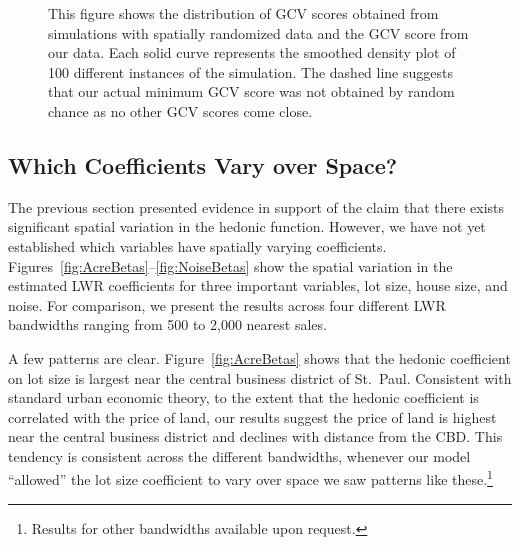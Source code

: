 \documentclass{article}\usepackage[]{graphicx}\usepackage[]{color}
\begin{document}
\begin{figure}
 \caption{This figure shows the distribution of GCV scores obtained from simulations with spatially randomized data and the GCV score from our data. Each solid curve represents the smoothed density plot of 100 different instances of the simulation. The dashed line suggests that our actual minimum GCV score was not obtained by random chance as no other GCV scores come close.}
 \label{fig:GCVSIM}
\end{figure}

\subsection*{Which Coefficients Vary over Space?}

The previous section presented evidence in support of the claim that there exists significant spatial variation in the hedonic function. However, we have not yet established which variables have spatially varying coefficients. Figures~\ref{fig:AcreBetas}--\ref{fig:NoiseBetas} show the spatial variation in the estimated LWR coefficients for three important variables, lot size, house size, and noise. For comparison, we present the results across four different LWR bandwidths ranging from 500 to 2,000 nearest sales. 

A few patterns are clear. Figure~\ref{fig:AcreBetas} shows that the hedonic coefficient on lot size is largest near the central business district of St.\ Paul. Consistent with standard urban economic theory, to the extent that the hedonic coefficient is correlated with the price of land, our results suggest the price of land is highest near the central business district and declines with distance from the CBD. This tendency is consistent across the different bandwidths, whenever our model ``allowed'' the lot size coefficient to vary over space we saw patterns like these.\footnote{Results for other bandwidths available upon request.} 
\end{document}
